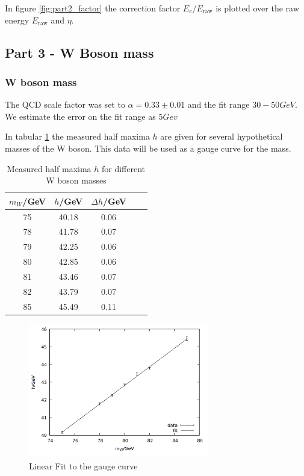 In figure \ref{fig:part2_factor} the correction factor $E_e/E_{\mathrm{raw}}$ is plotted over the raw energy $E_{\mathrm{raw}}$ and $\eta$. 

\subsection{Part 3 - W Boson mass}

\subsubsection{W boson mass}

The QCD scale factor was set to $\alpha = 0.33 \pm 0.01$ and the fit range $30 - 50 \si{GeV}$. We estimate the error on the fit range as $5 \si{Gev}$

In tabular \ref{tab:task3_33} the measured half maxima $h$ are given for several hypothetical masses of the W boson. This data will be used as a gauge curve for the mass.

\begin{table}
\centering
\caption{Measured half maxima $h$ for different W boson masses}
\begin{tabular}{ccccc}
\toprule
$m_W$/GeV & $h$/GeV & $\Delta h$/GeV\\ 
\midrule
75&	40.18&	0.06\\
78&	41.78&	0.07\\
79&	42.25&	0.06\\
80&	42.85&	0.06\\
81&	43.46&	0.07\\
82&	43.79&	0.07\\
85&	45.49&	0.11\\
\bottomrule
\end{tabular}
\label{tab:task3_33}
\end{table}

\begin{figure}
\centering
\includegraphics[width=0.7\textwidth]{data/33.png}
\caption{Linear Fit to the gauge curve}
\label{fig:task3_gauge}
\end{figure}

